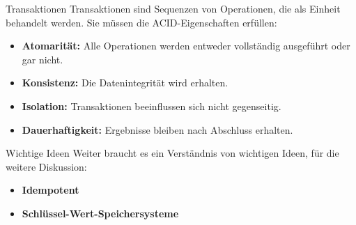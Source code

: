 \documentclass{beamer}
\begin{document}
\begin{frame}{Transaktionen}
    Transaktionen sind Sequenzen von Operationen, die als Einheit behandelt werden. Sie müssen die ACID-Eigenschaften erfüllen:
    \begin{itemize}
        \item \textbf{Atomarität:} Alle Operationen werden entweder vollständig ausgeführt oder gar nicht.
        \item \textbf{Konsistenz:} Die Datenintegrität wird erhalten.
        \item \textbf{Isolation:} Transaktionen beeinflussen sich nicht gegenseitig.
        \item \textbf{Dauerhaftigkeit:} Ergebnisse bleiben nach Abschluss erhalten.
    \end{itemize}
\end{frame}


\begin{frame}{Wichtige Ideen}
    Weiter braucht es ein Verständnis von wichtigen Ideen, für die weitere Diskussion:
    \begin{itemize}
        \item \textbf{Idempotent} 
        \item \textbf{Schlüssel-Wert-Speichersysteme} 
    \end{itemize}
\end{frame}
\end{document}
